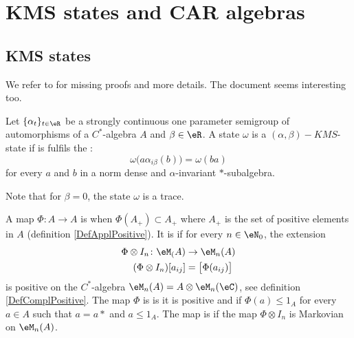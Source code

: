 
\section{KMS states and CAR algebras}

\subsection{KMS states}

We refer to \cite{CirpianiDirichlet} for missing proofs and more details. The document \cite{VaesLocCompQG} seems interesting too.

\begin{definition}
	Let $\{ \alpha_t\}_{t\in\eR}$ be a strongly continuous one parameter semigroup of automorphisms of a $C^*$-algebra $A$ and $\beta\in\eR$. A state $\omega$ is a $(\alpha,\beta)-KMS$-state if is fulfils the :
	\begin{equation}		\label{EqKMScondPourOmega}
		\omega\big( a\alpha_{i\beta}(b) \big)=\omega(ba)
	\end{equation}
	for every $a$ and $b$ in a norm dense and $\alpha$-invariant $*$-subalgebra.
\end{definition}
Note that for $\beta=0$, the state $\omega$ is a trace.

A map $\Phi\colon A\to A$ is  when $\Phi(A_+)\subset A_+$ where $A_+$ is the set of positive elements in $A$ (definition \ref{DefApplPositive}). It is  if for every $n\in\eN_0$, the extension
\begin{equation}
	\begin{aligned}
		\Phi\otimes I_n\colon \eM_(A)&\to \eM_n(A) \\
		(\Phi\otimes I_n)[a_{ij}]&=\big[ \Phi(a_{ij}) \big] 
	\end{aligned}
\end{equation}
is positive on the $C^*$-algebra $\eM_n(A)=A\otimes\eM_n(\eC)$, see definition \ref{DefComplPositive}. The map $\Phi$ is  is it is positive and if $\Phi(a)\leq 1_A$ for every $a\in A$ such that $a=a*$ and $a\leq 1_A$. The map is  if the map $\Phi\otimes I_n$ is Markovian on $\eM_n(A)$.

